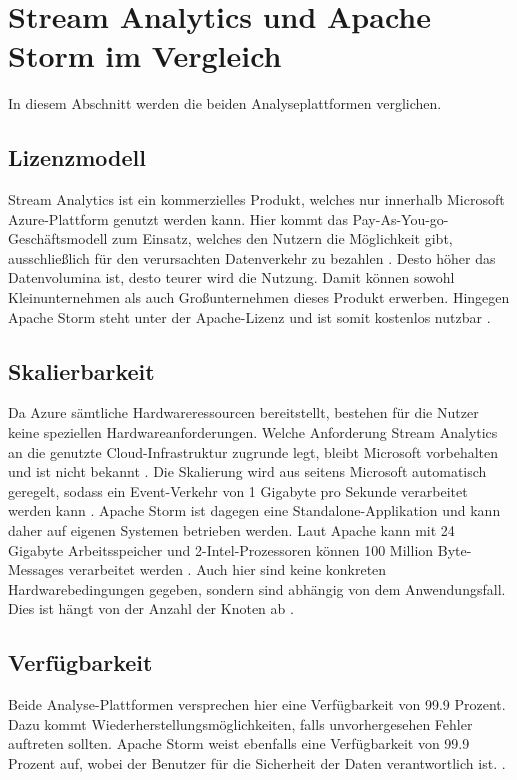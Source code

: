 \section{Stream Analytics und Apache Storm im Vergleich}
In diesem Abschnitt werden die beiden Analyseplattformen verglichen. 


\subsection{Lizenzmodell}
Stream Analytics ist ein kommerzielles Produkt, welches nur innerhalb Microsoft Azure-Plattform genutzt werden kann. Hier kommt das Pay-As-You-go-Geschäftsmodell zum Einsatz, welches den Nutzern die Möglichkeit gibt, ausschließlich für den verursachten Datenverkehr zu bezahlen \cite{Pricing.2017}.  Desto höher das Datenvolumina ist, desto teurer wird die Nutzung. Damit können sowohl Kleinunternehmen als auch Großunternehmen dieses Produkt erwerben. Hingegen Apache Storm steht unter der Apache-Lizenz und ist somit kostenlos nutzbar \cite{lizenz.2004}. 

\subsection{Skalierbarkeit}
Da Azure sämtliche Hardwareressourcen bereitstellt, bestehen für die Nutzer keine speziellen Hardwareanforderungen. Welche Anforderung Stream Analytics an die genutzte Cloud-Infrastruktur zugrunde legt, bleibt Microsoft vorbehalten und ist nicht bekannt \cite{samacha.2017}. Die Skalierung wird aus seitens Microsoft automatisch geregelt, sodass ein Event-Verkehr von 1 Gigabyte pro Sekunde verarbeitet werden kann \cite{samacha.19.12.2017b}. Apache Storm ist dagegen eine Standalone-Applikation und kann daher auf eigenen Systemen betrieben werden. Laut Apache kann mit 24 Gigabyte Arbeitsspeicher und 2-Intel-Prozessoren können 100 Million Byte-Messages verarbeitet werden \cite{apachescale.2017}. Auch hier sind keine konkreten Hardwarebedingungen gegeben, sondern sind abhängig von dem Anwendungsfall. Dies ist hängt von der Anzahl der Knoten ab \cite{samacha.2017}.


\subsection{Verfügbarkeit}
Beide Analyse-Plattformen versprechen hier eine Verfügbarkeit von 99.9 Prozent. Dazu kommt Wiederherstellungsmöglichkeiten, falls unvorhergesehen Fehler auftreten sollten. Apache Storm weist ebenfalls eine Verfügbarkeit von 99.9 Prozent auf, wobei der Benutzer für die Sicherheit der Daten verantwortlich ist. \cite{samacha.2017}. 

